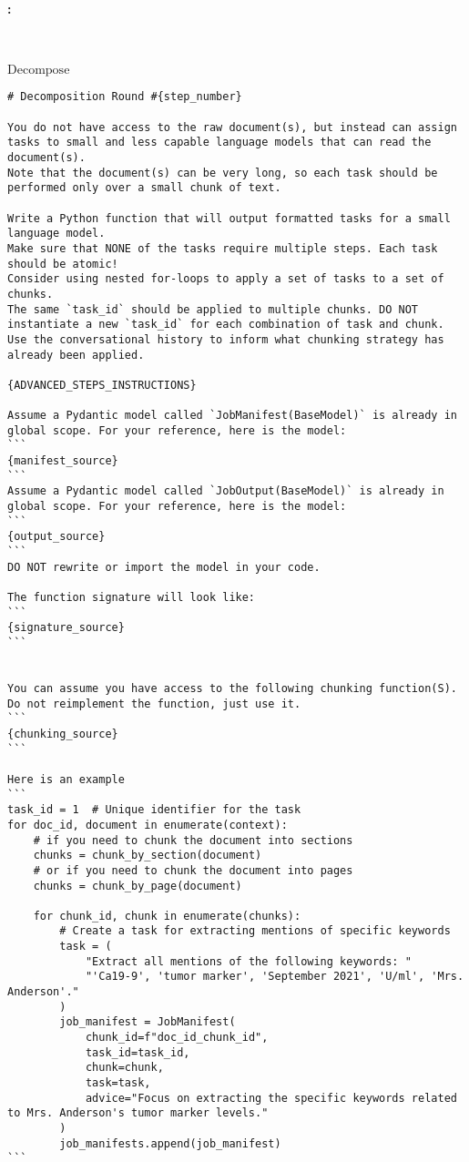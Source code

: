 \paragraph{\system: \longhealth} \

\textbf{$\mathrm{Decompose}$}
\begin{tcolorbox}[colback=gray!10,  width=\textwidth]
\tiny
\begin{lstlisting}[breaklines]
# Decomposition Round #{step_number}

You do not have access to the raw document(s), but instead can assign tasks to small and less capable language models that can read the document(s).
Note that the document(s) can be very long, so each task should be performed only over a small chunk of text. 

Write a Python function that will output formatted tasks for a small language model.
Make sure that NONE of the tasks require multiple steps. Each task should be atomic! 
Consider using nested for-loops to apply a set of tasks to a set of chunks.
The same `task_id` should be applied to multiple chunks. DO NOT instantiate a new `task_id` for each combination of task and chunk.
Use the conversational history to inform what chunking strategy has already been applied.

{ADVANCED_STEPS_INSTRUCTIONS}

Assume a Pydantic model called `JobManifest(BaseModel)` is already in global scope. For your reference, here is the model:
```
{manifest_source}
```
Assume a Pydantic model called `JobOutput(BaseModel)` is already in global scope. For your reference, here is the model:
```
{output_source}
```
DO NOT rewrite or import the model in your code.

The function signature will look like:
```
{signature_source}
```


You can assume you have access to the following chunking function(S). Do not reimplement the function, just use it.
```
{chunking_source}
```

Here is an example
```
task_id = 1  # Unique identifier for the task
for doc_id, document in enumerate(context):
    # if you need to chunk the document into sections
    chunks = chunk_by_section(document)
    # or if you need to chunk the document into pages
    chunks = chunk_by_page(document)

    for chunk_id, chunk in enumerate(chunks):
        # Create a task for extracting mentions of specific keywords
        task = (
            "Extract all mentions of the following keywords: "
            "'Ca19-9', 'tumor marker', 'September 2021', 'U/ml', 'Mrs. Anderson'."
        )
        job_manifest = JobManifest(
            chunk_id=f"doc_id_chunk_id",
            task_id=task_id,
            chunk=chunk,
            task=task,
            advice="Focus on extracting the specific keywords related to Mrs. Anderson's tumor marker levels."
        )
        job_manifests.append(job_manifest)
```
\end{lstlisting}
\end{tcolorbox}

